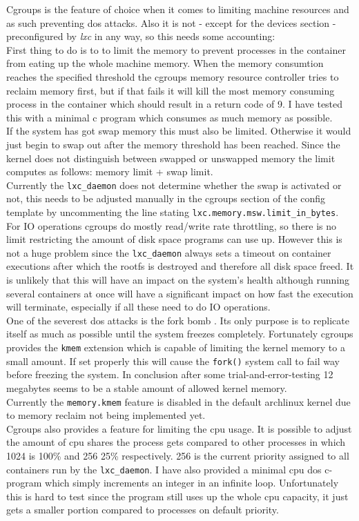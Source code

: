 Cgroups is the feature of choice when it comes to limiting machine resources and as such preventing dos attacks.
Also it is not - except for the devices section - preconfigured by \textit{lxc} in any way, so this needs some accounting:\\
First thing to do is to to limit the memory to prevent processes in the container from eating up the whole machine memory.
When the memory consumtion reaches the specified threshold the cgroups memory resource controller tries to reclaim memory first,
but if that fails it will kill the most memory consuming process in the container which should result in a return code of 9\cite{cgrpmem}.
I have tested this with a minimal c program which consumes as much memory as possible.\\
If the system has got swap memory this must also be limited. Otherwise it would just begin to swap out after the memory
threshold has been reached. Since the kernel does not distinguish between swapped or unswapped memory the limit computes as follows:
memory limit + swap limit.\\
Currently the \texttt{lxc\_daemon} does not determine whether the swap is activated or not, this needs to be adjusted manually in the cgroups
section of the config template by uncommenting the line stating \texttt{lxc.memory.msw.limit\_in\_bytes}.\\
For IO operations cgroups do mostly read/write rate throttling, so there is no limit restricting the amount of disk space programs
can use up. However this is not a huge problem since the \texttt{lxc\_daemon} always sets a timeout on container executions after which the
rootfs is destroyed and therefore all disk space freed. It is unlikely that this will have an impact on the system's health although
running several containers at once will have a significant impact on how fast the execution will terminate, especially if all these
need to do IO operations.\\
One of the severest dos attacks is the fork bomb \cite{forkbomb}. Its only purpose is to replicate itself as much as possible until
the system freezes completely. Fortunately cgroups provides
the \texttt{kmem} extension which is capable of limiting the kernel memory to a small amount. If set properly this will cause the \texttt{fork()}
system call to fail way before freezing the system. In conclusion after some trial-and-error-testing 12 megabytes seems to be a
stable amount of allowed kernel memory.\\
Currently the \texttt{memory.kmem} feature is disabled in the default archlinux kernel due to memory reclaim not being implemented yet\cite{kmembug}.\\
Cgroups also provides a feature for limiting the cpu usage. It is possible to adjust the amount of cpu shares the process gets compared to
other processes in which 1024 is 100\% and 256 25\% respectively. 256 is the current priority assigned to all containers run by the \texttt{lxc\_daemon}.
I have also provided a minimal cpu dos c-program which simply increments an integer in an infinite loop. Unfortunately this is hard to test
since the program still uses up the whole cpu capacity, it just gets a smaller portion compared to processes on default priority.

